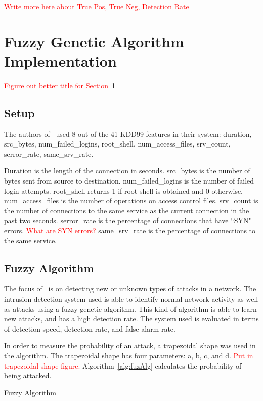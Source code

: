 \documentclass{sig-alternate}
\newcommand{\mycomment}[1]{\textcolor{red}{#1}}
\begin{document}
\mycomment{Write more here about True Pos, True Neg, Detection Rate}




\section{Fuzzy Genetic Algorithm Implementation}
\label{sec:fuzGenAlgImp}
\mycomment{Figure out better title for Section~\ref{sec:fuzGenAlgImp}}

\subsection{Setup}
The authors of~\cite{6496342, 6559603} used 8 out of the 41 KDD99 features in their system: duration, src\_bytes, num\_failed\_logins, root\_shell, num\_access\_files, srv\_count, serror\_rate, same\_srv\_rate.

Duration is the length of the connection in seconds. src\_bytes is the number of bytes sent from source to destination. num\_failed\_logins is the number of failed login attempts. root\_shell returns 1 if root shell is obtained and 0 otherwise. num\_access\_files is the number of operations on access control files. srv\_count is the number of connections to the same service as the current connection in the past two seconds. serror\_rate is the percentage of connections that have ``SYN" errors.
\mycomment{What are SYN errors?}
 same\_srv\_rate is the percentage of connections to the same service.~\cite{KDD99Features}




\subsection{Fuzzy Algorithm}
The focus of~\cite{6496342, 6559603} is on detecting new or unknown types of attacks in a network. The intrusion detection system used is able to identify normal network activity as well as attacks using a fuzzy genetic algorithm. This kind of algorithm is able to learn new attacks, and has a high detection rate. The system used is evaluated in terms of detection speed, detection rate, and false alarm rate.

In order to measure the probability of an attack, a trapezoidal shape was used in the algorithm. The trapezoidal shape has four parameters: a, b, c, and d. 
\mycomment{Put in trapezoidal shape figure.} Algorithm~\ref{alg:fuzAlg} calculates the probability of being attacked.

\begin{algorithm}
\caption{Fuzzy Algorithm}
\label{alg:fuzAlg}
\begin{algorithmic}
\ELSE {}
\ENDIF
\end{algorithmic}
\end{algorithm}
\end{document}

